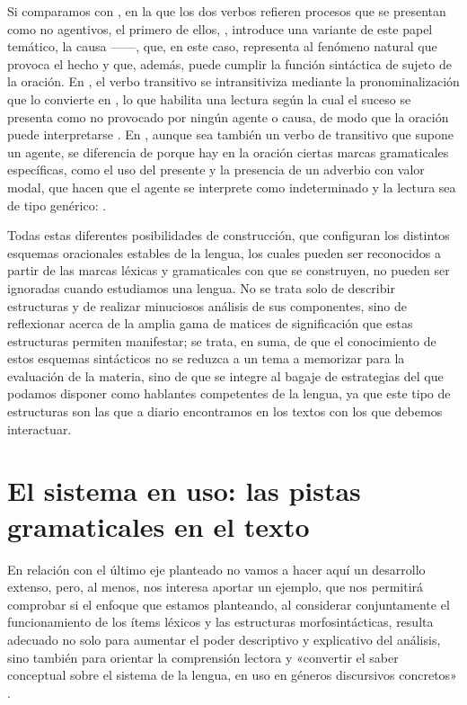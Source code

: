 Si comparamos  con , en la
que los dos verbos refieren procesos que se presentan como no agentivos, el
primero de ellos, , introduce una variante de este
papel temático, la causa ------,
que, en este caso, representa al fenómeno natural que provoca el hecho y que,
además, puede cumplir la función sintáctica de sujeto de la oración. En
, el verbo transitivo  se
intransitiviza mediante la pronominalización que lo convierte en
, lo que habilita una lectura según la cual el suceso se
presenta como no provocado por ningún agente o causa, de modo que la oración
puede interpretarse . En
, aunque  sea también un verbo de
 transitivo que supone un agente, se diferencia de
 porque hay en la oración ciertas marcas gramaticales
específicas, como el uso del presente y la presencia de un adverbio con valor
modal, que hacen que el agente se interprete como indeterminado y la lectura sea
de tipo genérico: .

Todas estas diferentes posibilidades de construcción, que configuran los
distintos esquemas oracionales estables de la lengua, los cuales pueden ser
reconocidos a partir de las marcas léxicas y gramaticales con que se
construyen, no pueden ser ignoradas cuando estudiamos una lengua. No se trata
solo de describir estructuras y de realizar minuciosos análisis de sus
componentes, sino de reflexionar acerca de la amplia gama de matices de
significación que estas estructuras permiten manifestar; se trata, en suma, de
que el conocimiento de estos esquemas sintácticos no se reduzca a un tema a
memorizar para la evaluación de la materia, sino de que se integre al bagaje de
estrategias del que podamos disponer como hablantes competentes de la lengua,
ya que este tipo de estructuras son las que a diario encontramos en los textos
con los que debemos interactuar.

\section{El sistema en uso: las pistas gramaticales en el texto}

En relación con el último eje planteado no vamos a hacer aquí un desarrollo
extenso, pero, al menos, nos interesa aportar un ejemplo, que nos permitirá
comprobar si el enfoque que estamos planteando, al considerar conjuntamente el
funcionamiento de los ítems léxicos y las estructuras morfosintácticas, resulta
adecuado no solo para aumentar el poder descriptivo y explicativo del análisis,
sino también para orientar la comprensión lectora y «convertir el saber
conceptual sobre el sistema de la lengua, en uso en géneros discursivos
concretos» \parencite{fontich2006}.


